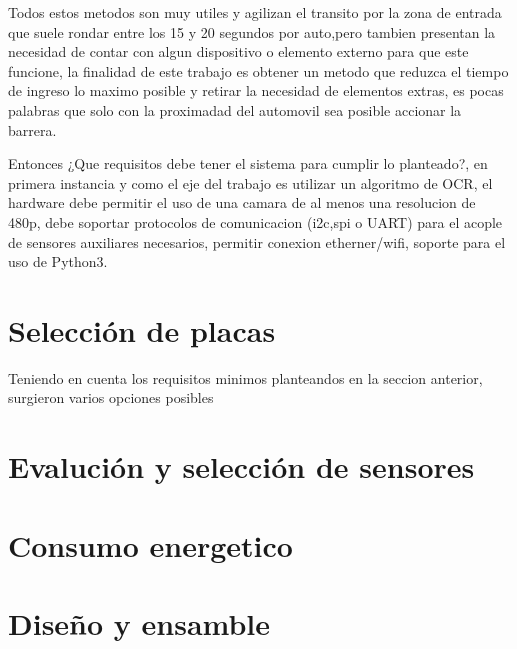 Todos estos  metodos son muy utiles y agilizan el transito por la zona de entrada que suele rondar entre los 15 y 20 segundos por 
auto,pero tambien presentan la necesidad de contar con algun dispositivo o elemento externo para que este funcione, la finalidad
de este trabajo es obtener un metodo que reduzca el tiempo de ingreso lo maximo posible y retirar la necesidad de elementos
extras, es pocas palabras que solo con la proximadad del automovil sea posible accionar la barrera.

Entonces ¿Que requisitos debe tener el sistema para cumplir lo planteado?, en primera instancia y como el eje del trabajo
es utilizar un algoritmo de OCR, el hardware debe permitir el uso de una camara de al menos una resolucion de 480p, debe 
soportar protocolos de comunicacion (i2c,spi o UART) para el acople de sensores auxiliares necesarios, permitir conexion
etherner/wifi, soporte para el uso de Python3.

\section{Selección de placas}
Teniendo en cuenta los requisitos minimos planteandos en la seccion anterior, surgieron varios opciones posibles 

\section{Evalución y selección de sensores}

\section{Consumo energetico}

\section{Diseño y ensamble}
